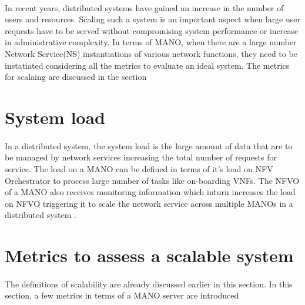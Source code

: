 \paragraph{}
In recent years, distributed systems have gained an increase in the number of users and resources. Scaling such a system is an important aspect when large user requests have to be served without compromising system performance or increase in administrative complexity. In terms of MANO, when there are a large number Network Service(NS) instantiations of various network functions, they need to be instatiated considering all the metrics to evaluate an ideal system. The metrics for scalaing are discussed in the section 



\section{System load}
\paragraph{}In a distributed system, the system load is the large amount of data that are to be managed by network services increasing the total number of requests for service.
The load on a MANO can be defined in terms of it's load on NFV Orchestrator to process large number of tasks like on-boarding VNFs. The NFVO of a MANO also receives monitoring information which inturn increases the load on NFVO triggering it to scale the network service across multiple MANOs in a distributed system \cite{soenen2017optimising}.


\section{Metrics to assess a scalable system}
\paragraph{}The definitions of scalability are already discussed earlier in this section. In this section, a few metrics in terms of a MANO server are introduced

